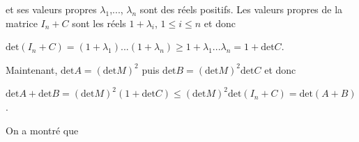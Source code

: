 {{ 
et ses valeurs propres $\lambda_1$,..., $\lambda_n$ sont des réels positifs. Les valeurs propres de la matrice $I_n + C$ sont les réels $1 +\lambda_i$, $1\leqslant i\leqslant n$  et donc 

\begin{center}
$\text{det}(I_n+C) = (1+\lambda_1)...(1+\lambda_n)\geqslant 1 +\lambda_1...\lambda_n = 1 +\text{det}C$.
\end{center}

Maintenant, $\text{det}A = (\text{det}M)^2$ puis $\text{det}B=(\text{det}M)^2\text{det}C$ et donc

\begin{center}
$\text{det}A +\text{det}B =(\text{det}M)^2(1+\text{det}C)\leqslant (\text{det}M)^2\text{det}(I_n+C) = \text{det}(A+B)$.
\end{center}

On a montré que

\begin{center}
\end{center}
}
}
